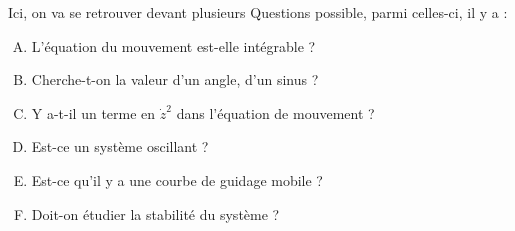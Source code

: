 \documentclass[a4paper]{article}
\begin{document}
Ici, on va se retrouver devant plusieurs Questions possible, parmi celles-ci, il y a : 
\begin{enumerate}[A.]
\item L'équation du mouvement est-elle intégrable ?
\item Cherche-t-on la valeur d'un angle, d'un sinus ?
\item Y a-t-il un terme en $ \dot{z}^2 $ dans l'équation de mouvement ?
\item Est-ce un système oscillant ?
\item Est-ce qu'il y a une courbe de guidage mobile ?
\item Doit-on étudier la stabilité du système ?
\end{enumerate}
\end{document}
